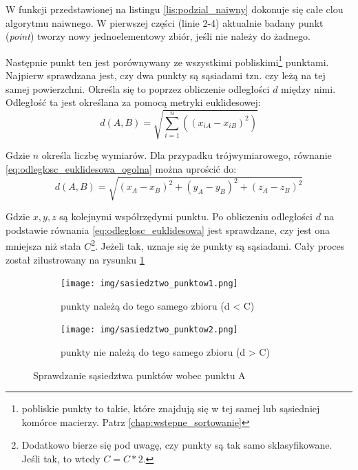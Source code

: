 W funkcji przedstawionej na listingu \ref{lis:podzial_naiwny} dokonuje się całe clou algorytmu naiwnego.
W pierwszej części (linie 2-4) aktualnie badany punkt (\textit{point}) tworzy nowy jednoelementowy zbiór,
jeśli nie należy do żadnego.

Następnie punkt ten jest porównywany ze wszystkimi pobliskimi\footnote{pobliskie punkty to takie,
które znajdują się w tej samej lub sąsiedniej komórce macierzy. Patrz \autoref{chap:wstepne_sortowanie}}
punktami. Najpierw sprawdzana jest, czy dwa punkty są sąsiadami tzn. czy leżą na tej samej powierzchni. 
Określa się to poprzez obliczenie odległości $d$ między nimi. Odległość ta jest określana za pomocą  metryki euklidesowej:
\begin{equation} \label{eq:odleglosc_euklidesowa_ogolna}
    d(A,B) = \sqrt{\sum\limits_{i=1}^n((x_{iA}-x_{iB})^2)}
\end{equation}

\noindent Gdzie $n$ określa liczbę wymiarów. Dla przypadku trójwymiarowego, równanie \ref{eq:odleglosc_euklidesowa_ogolna} można uprościć do:
\begin{equation} \label{eq:odleglosc_euklidesowa}
    d(A,B) = \sqrt{(x_A - x_B)^2 + (y_A - y_B)^2 + (z_A - z_B)^2}
\end{equation}

Gdzie $x, y, z$ są kolejnymi współrzędymi punktu. Po obliczeniu odległości $d$ na podstawie równania \ref{eq:odleglosc_euklidesowa}
jest sprawdzane, czy jest ona mniejsza niż stała $C$\footnote{Dodatkowo bierze się pod uwagę, czy punkty są tak samo sklasyfikowane.
Jeśli tak, to wtedy $C = C*2$.}. Jeżeli tak, uznaje się że punkty są sąsiadami. Cały proces został zilustrowany na
rysunku \ref{fig:sprawdzanie_sasiedztwa}

\begin{figure}[h!]
    \centering
    \begin{subfigure}[b]{0.3\textwidth}
        \texttt{[image: img/sasiedztwo\_punktow1.png]}
        \caption {punkty należą do tego samego zbioru (d < C)}
    \end{subfigure}
    \quad
    \begin{subfigure}[b]{0.3\textwidth}
        \texttt{[image: img/sasiedztwo\_punktow2.png]}
        \caption {punkty nie należą do tego samego zbioru (d > C)}
    \end{subfigure}%
    \caption{Sprawdzanie sąsiedztwa punktów wobec punktu A}
    \label{fig:sprawdzanie_sasiedztwa}
\end{figure}


